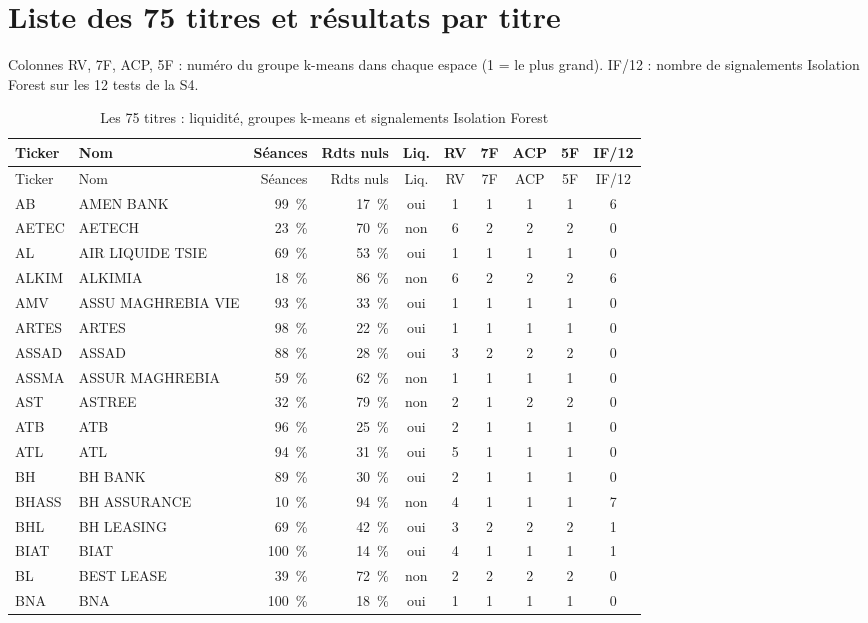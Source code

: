\documentclass[11pt,a4paper]{article}
\begin{document}
\section{Liste des 75 titres et résultats par titre}\label{ann:titres}
Colonnes RV, 7F, ACP, 5F : numéro du groupe k-means dans chaque espace (1 = le plus grand). IF/12 : nombre de signalements Isolation Forest sur les 12 tests de la S4.
{\small\begin{longtable}{llrrcccccc}
\caption{Les 75 titres : liquidité, groupes k-means et signalements Isolation Forest}\label{tab:annexe-titres}\\
\toprule Ticker & Nom & Séances & Rdts nuls & Liq. & RV & 7F & ACP & 5F & IF/12 \\ \midrule \endfirsthead
\toprule Ticker & Nom & Séances & Rdts nuls & Liq. & RV & 7F & ACP & 5F & IF/12 \\ \midrule \endhead \bottomrule \endfoot
AB & AMEN BANK & 99~\% & 17~\% & oui & 1 & 1 & 1 & 1 & 6 \\
AETEC & AETECH & 23~\% & 70~\% & non & 6 & 2 & 2 & 2 & 0 \\
AL & AIR LIQUIDE TSIE & 69~\% & 53~\% & oui & 1 & 1 & 1 & 1 & 0 \\
ALKIM & ALKIMIA & 18~\% & 86~\% & non & 6 & 2 & 2 & 2 & 6 \\
AMV & ASSU MAGHREBIA VIE & 93~\% & 33~\% & oui & 1 & 1 & 1 & 1 & 0 \\
ARTES & ARTES & 98~\% & 22~\% & oui & 1 & 1 & 1 & 1 & 0 \\
ASSAD & ASSAD & 88~\% & 28~\% & oui & 3 & 2 & 2 & 2 & 0 \\
ASSMA & ASSUR MAGHREBIA & 59~\% & 62~\% & non & 1 & 1 & 1 & 1 & 0 \\
AST & ASTREE & 32~\% & 79~\% & non & 2 & 1 & 2 & 2 & 0 \\
ATB & ATB & 96~\% & 25~\% & oui & 2 & 1 & 1 & 1 & 0 \\
ATL & ATL & 94~\% & 31~\% & oui & 5 & 1 & 1 & 1 & 0 \\
BH & BH BANK & 89~\% & 30~\% & oui & 2 & 1 & 1 & 1 & 0 \\
BHASS & BH ASSURANCE & 10~\% & 94~\% & non & 4 & 1 & 1 & 1 & 7 \\
BHL & BH LEASING & 69~\% & 42~\% & oui & 3 & 2 & 2 & 2 & 1 \\
BIAT & BIAT & 100~\% & 14~\% & oui & 4 & 1 & 1 & 1 & 1 \\
BL & BEST LEASE & 39~\% & 72~\% & non & 2 & 2 & 2 & 2 & 0 \\
BNA & BNA & 100~\% & 18~\% & oui & 1 & 1 & 1 & 1 & 0 \\

\end{longtable}}
\end{document}
